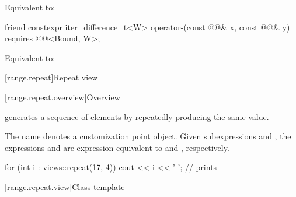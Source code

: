 \begin{itemdescr}
\pnum
\effects
Equivalent to: 
\end{itemdescr}

\begin{itemdecl}
friend constexpr iter_difference_t<W> operator-(const @@& x, const @@& y)
  requires @@<Bound, W>;
\end{itemdecl}

\begin{itemdescr}
\pnum
\effects
Equivalent to: 
\end{itemdescr}

[range.repeat]{Repeat view}

[range.repeat.overview]{Overview}

\pnum
{} generates a sequence of elements
by repeatedly producing the same value.

\pnum
{}%
The name  denotes
a customization point object.
Given subexpressions  and ,
the expressions  and 
are expression-equivalent to
 and , respectively.

\pnum
\begin{example}
\begin{codeblock}
for (int i : views::repeat(17, 4))
  cout << i << ' ';
// prints 
\end{codeblock}
\end{example}

[range.repeat.view]{Class template }

